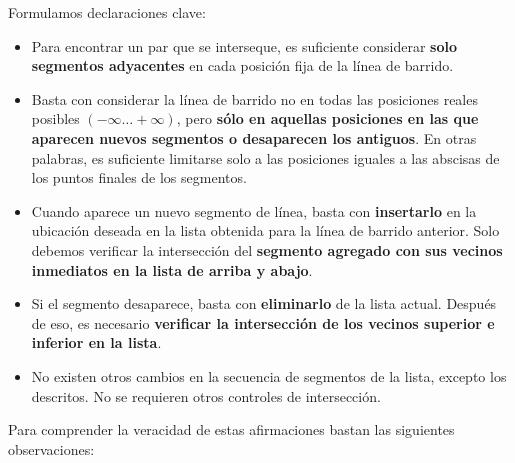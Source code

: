 Formulamos declaraciones clave:

\begin{itemize}
	\item Para encontrar un par que se interseque, es suficiente considerar \textbf{solo segmentos adyacentes} en cada posición fija de la línea de barrido.
	\item Basta con considerar la línea de barrido no en todas las posiciones reales posibles $(-\infty\ldots +\infty)$, pero \textbf{sólo en aquellas posiciones en las que aparecen nuevos segmentos o desaparecen los antiguos}. En otras palabras, es suficiente limitarse solo a las posiciones iguales a las abscisas de los puntos finales de los segmentos.
	\item Cuando aparece un nuevo segmento de línea, basta con \textbf{insertarlo} en la ubicación deseada en la lista obtenida para la línea de barrido anterior. Solo debemos verificar la intersección del \textbf{segmento agregado con sus vecinos inmediatos en la lista de arriba y abajo}.
	\item Si el segmento desaparece, basta con \textbf{eliminarlo} de la lista actual. Después de eso, es necesario \textbf{verificar la intersección de los vecinos superior e inferior en la lista}.
	\item No existen otros cambios en la secuencia de segmentos de la lista, excepto los descritos. No se requieren otros controles de intersección.
\end{itemize}

Para comprender la veracidad de estas afirmaciones bastan las siguientes observaciones:


